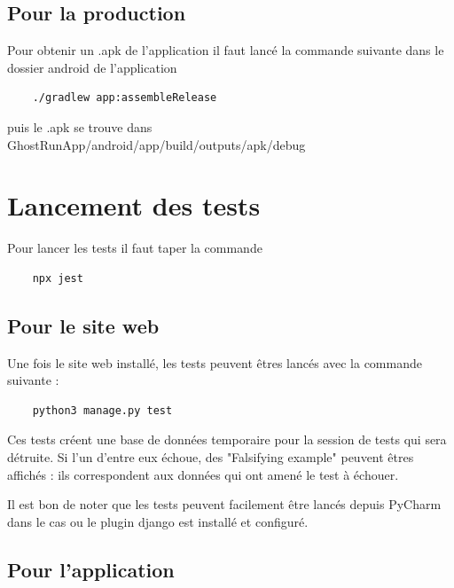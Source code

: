\subsection{Pour la production}

Pour obtenir un .apk de l'application il faut lancé la commande suivante dans le dossier android de l'application

\begin{verbatim}
    ./gradlew app:assembleRelease
\end{verbatim}

puis le .apk se trouve dans GhostRunApp/android/app/build/outputs/apk/debug

\section{Lancement des tests}
Pour lancer les tests il faut taper la commande

\begin{verbatim}
    npx jest
\end{verbatim}



\subsection{Pour le site web}

Une fois le site web installé, les tests peuvent êtres lancés avec la commande suivante :


\begin{verbatim}
    python3 manage.py test
\end{verbatim}

Ces tests créent une base de données temporaire pour la session de tests qui sera détruite. Si l'un d'entre eux échoue, des "Falsifying example" peuvent êtres affichés : ils correspondent aux données qui ont amené le test à échouer.

Il est bon de noter que les tests peuvent facilement être lancés depuis PyCharm dans le cas ou le plugin \Gls{django} est installé et configuré.

\subsection{Pour l'application}

